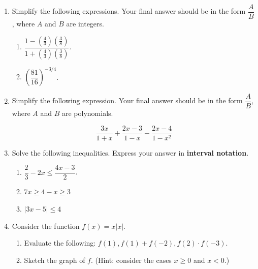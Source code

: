 \documentclass[12pt]{article}
\newcommand{\points}[1]{\marginpar{\hspace{24pt}[#1]}}
\newcommand{\di}{\displaystyle}
\begin{document}
\begin{enumerate}
\item Simplify the following expressions. Your final answer should be in the form $\dfrac{A}{B}$, where $A$ and $B$ are integers.
\begin{enumerate}
 \item $\dfrac{1-\left(\frac{4}{3}\right)\left(\frac{3}{8}\right)}{1+\left(\frac{4}{3}\right)\left(\frac{3}{8}\right)}$. \points{3}

\vspace{1.75in}

 \item $\left(\dfrac{81}{16}\right)^{-3/4}$. \points{3}

\vspace{1.75in}

\end{enumerate}
\item Simplify the following expression. Your final answer should be in the form $\dfrac{A}{B}$, where $A$ and $B$ are polynomials.\points{4} 

\[
\di \frac{3x}{1+x}+\frac{2x-3}{1-x}-\frac{2x-4}{1-x^2} 
\]

\newpage

\item Solve the following inequalities. Express your answer in {\bf interval notation}.
\begin{enumerate}
 \item $\dfrac{2}{3}-2x \leq \dfrac{4x-3}{2}$. \points{3}

\vspace{2in}

 \item $7x\geq 4-x\geq 3$ \points{4}

\vspace{2in}

 \item $\lvert 3x-5\rvert \leq 4$ \points{3}
\end{enumerate}
\newpage

\item Consider the function $f(x) = x\lvert x\rvert$.
\begin{enumerate}
 \item Evaluate the following: $f(1), f(1) + f(-2), f(2)\cdot f(-3)$. \points{3}

\vspace{1.5in}

 \item Sketch the graph of $f$. (Hint: consider the cases $x\geq 0$ and $x<0$.) \points{3}


\end{enumerate}
\end{enumerate}
\end{document}
